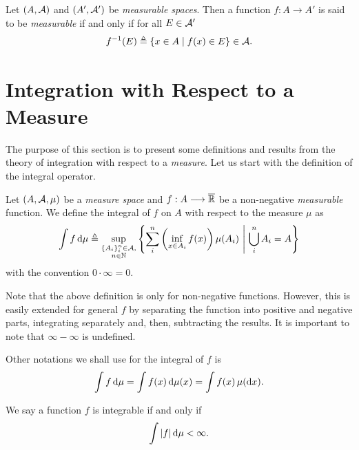 \begin{definition}
    Let $(A,\cal{A})$ and $(A',\cal{A}')$ be \textit{measurable spaces}.
    Then a function ${f: A\longrightarrow A'}$ is said to be \textit{measurable} if and only if for all $E \in \cal{A}'$
    \begin{align*} 
        f^{-1}(E) \triangleq \{ x\in A \mid f(x)\in E \} \in \cal{A}.
    \end{align*}
\end{definition}
%

\section{Integration with Respect to a Measure}

The purpose of this section is to present some definitions and results from the theory of integration with respect to a \textit{measure}.
%
Let us start with the definition of the integral operator.

\begin{definition}
    Let $(A,\cal A, \mu)$ be a \textit{measure space} and $f:A\longrightarrow \overline\R$ be a non-negative \textit{measurable} function.
    We define the integral of $f$ on $A$ with respect to the measure $\mu$ as
    \begin{align*}
        \int f \, \d \mu \triangleq \sup_{\substack{\{A_i\}_i^n \in \cal A,\\ n \in \N}} \left\{ \sum_i^n \left( \inf_{x\in A_i} f(x) \right) \mu(A_i) ~\middle\vert~ \bigcup_i^n A_i = A\right\}
    \end{align*}
    with the convention $0\cdot\infty = 0$.
\end{definition}

Note that the above definition is only for non-negative functions. However, this is easily extended for general $f$ by separating the function into positive and negative parts, integrating separately and, then, subtracting the results.
%
It is important to note that $\infty - \infty$ is undefined.

Other notations we shall use for the integral of $f$ is
\begin{align*}
    \int f \, \d \mu = \int f(x) \, \d\mu(x) = \int f(x) \, \mu(\d x).
\end{align*}

We say a function $f$ is integrable if and only if
\begin{align*}
    \int |f| \,\d\mu < \infty.
\end{align*}

